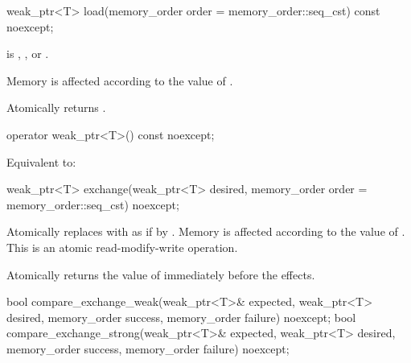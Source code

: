 %
\begin{itemdecl}
weak_ptr<T> load(memory_order order = memory_order::seq_cst) const noexcept;
\end{itemdecl}

\begin{itemdescr}
\pnum
\expects
{} is
,
, or
.

\pnum
\effects
Memory is affected according to the value of .

\pnum
\returns
Atomically returns .
\end{itemdescr}

%
\begin{itemdecl}
operator weak_ptr<T>() const noexcept;
\end{itemdecl}

\begin{itemdescr}
\pnum
\effects
Equivalent to: 
\end{itemdescr}

%
\begin{itemdecl}
weak_ptr<T> exchange(weak_ptr<T> desired, memory_order order = memory_order::seq_cst) noexcept;
\end{itemdecl}

\begin{itemdescr}
\pnum
\effects
Atomically replaces  with 
as if by .
Memory is affected according to the value of .
This is an atomic read-modify-write operation.

\pnum
\returns
Atomically returns the value of  immediately before the effects.
\end{itemdescr}

%
\begin{itemdecl}
bool compare_exchange_weak(weak_ptr<T>& expected, weak_ptr<T> desired,
                           memory_order success, memory_order failure) noexcept;
bool compare_exchange_strong(weak_ptr<T>& expected, weak_ptr<T> desired,
                             memory_order success, memory_order failure) noexcept;
\end{itemdecl}

